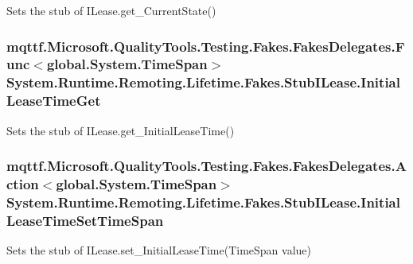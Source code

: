 Sets the stub of I\-Lease.\-get\-\_\-\-Current\-State()

\hypertarget{class_system_1_1_runtime_1_1_remoting_1_1_lifetime_1_1_fakes_1_1_stub_i_lease_a71e2ffa307eb405b29a69623bd76c3ed}{
\subsubsection[{Initial\-Lease\-Time\-Get}]{\setlength{\rightskip}{0pt plus 5cm}mqttf.\-Microsoft.\-Quality\-Tools.\-Testing.\-Fakes.\-Fakes\-Delegates.\-Func$<$global.\-System.\-Time\-Span$>$ System.\-Runtime.\-Remoting.\-Lifetime.\-Fakes.\-Stub\-I\-Lease.\-Initial\-Lease\-Time\-Get}}\label{class_system_1_1_runtime_1_1_remoting_1_1_lifetime_1_1_fakes_1_1_stub_i_lease_a71e2ffa307eb405b29a69623bd76c3ed}


Sets the stub of I\-Lease.\-get\-\_\-\-Initial\-Lease\-Time()

\hypertarget{class_system_1_1_runtime_1_1_remoting_1_1_lifetime_1_1_fakes_1_1_stub_i_lease_a50aafa48b81ef08090016361b42dc596}{
\subsubsection[{Initial\-Lease\-Time\-Set\-Time\-Span}]{\setlength{\rightskip}{0pt plus 5cm}mqttf.\-Microsoft.\-Quality\-Tools.\-Testing.\-Fakes.\-Fakes\-Delegates.\-Action$<$global.\-System.\-Time\-Span$>$ System.\-Runtime.\-Remoting.\-Lifetime.\-Fakes.\-Stub\-I\-Lease.\-Initial\-Lease\-Time\-Set\-Time\-Span}}\label{class_system_1_1_runtime_1_1_remoting_1_1_lifetime_1_1_fakes_1_1_stub_i_lease_a50aafa48b81ef08090016361b42dc596}


Sets the stub of I\-Lease.\-set\-\_\-\-Initial\-Lease\-Time(\-Time\-Span value)

